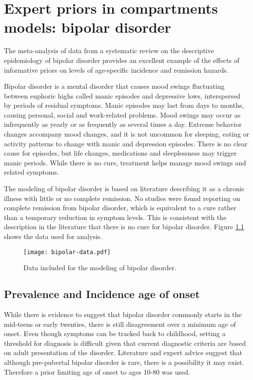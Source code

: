 \chapter{Expert priors in compartments models: bipolar disorder}
\label{applications-prior_level_vals}

The meta-analysis of data from a systematic review on the descriptive epidemiology of bipolar disorder provides an excellent example of the effects of informative priors on levels of age-specific incidence and remission hazards.

Bipolar disorder is a mental disorder that causes mood swings fluctuating between euphoric highs called manic episodes and depressive lows, interspersed by periods of residual symptoms.  Manic episodes may last from days to months, causing personal, social and work-related problems.  Mood swings may occur as infrequently as yearly or as frequently as several times a day.  Extreme behavior changes accompany mood changes, and it is not uncommon for sleeping, eating or activity patterns to change with manic and depression episodes.  There is no clear cause for episodes, but life changes, medications and sleeplessness may trigger manic periods.  While there is no cure, treatment helps manage mood swings and related symptoms. \cite{kloos_bipolar_2011, angst_historical_2000}

The modeling of bipolar disorder is based on literature describing it as a chronic illness with little or no complete remission.  No studies were found reporting on complete remission from bipolar disorder, which is equivalent to a cure rather than a temporary reduction in symptom levels.  This is consistent with the description in the literature that there is no cure for bipolar disorder. \cite{american_diagnostic_2000}  Figure \ref{fig:app-bipolar data} shows the data used for analysis.

    \begin{figure}[h]
        \begin{center}
            \texttt{[image: bipolar-data.pdf]}
            \caption{Data included for the modeling of bipolar disorder.}
            \label{fig:app-bipolar data}
        \end{center}
    \end{figure}

\section{Prevalence and Incidence age of onset}
While there is evidence to suggest that bipolar disorder commonly starts in the mid-teens or early twenties, there is still disagreement over a minimum age of onset. Even though symptoms can be tracked back to childhood, setting a threshold for diagnosis is difficult given that current diagnostic criteria are based on adult presentation of the disorder. Literature and expert advice suggest that although pre-pubertal bipolar disorder is rare, there is a possibility it may exist. \cite{kloos_bipolar_2011, angst_historical_2000}  Therefore a prior limiting age of onset to ages 10-80 was used.

